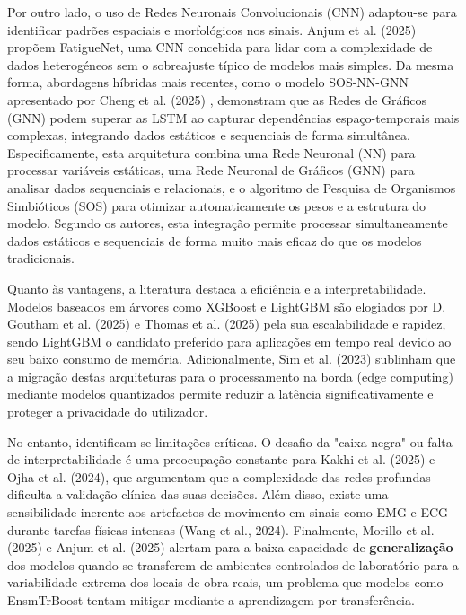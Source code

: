 Por outro lado, o uso de Redes Neuronais Convolucionais (CNN) adaptou-se para identificar padrões espaciais e morfológicos nos sinais. Anjum et al. (2025) \cite{anjum2025} propõem FatigueNet, uma CNN concebida para lidar com a complexidade de dados heterogéneos sem o sobreajuste típico de modelos mais simples. Da mesma forma, abordagens híbridas mais recentes, como o modelo SOS-NN-GNN apresentado por Cheng et al. (2025) \cite{cheng2025}, demonstram que as Redes de Gráficos (GNN) podem superar as LSTM ao capturar dependências espaço-temporais mais complexas, integrando dados estáticos e sequenciais de forma simultânea. Especificamente, esta arquitetura combina uma Rede Neuronal (NN) para processar variáveis estáticas, uma Rede Neuronal de Gráficos (GNN) para analisar dados sequenciais e relacionais, e o algoritmo de Pesquisa de Organismos Simbióticos (SOS) para otimizar automaticamente os pesos e a estrutura do modelo. Segundo os autores, esta integração permite processar simultaneamente dados estáticos e sequenciais de forma muito mais eficaz do que os modelos tradicionais.

Quanto às vantagens, a literatura destaca a eficiência e a interpretabilidade. Modelos baseados em árvores como XGBoost e LightGBM são elogiados por D. Goutham et al. (2025) e Thomas et al. (2025)\cite{goutham2025,thomas2025} pela sua escalabilidade e rapidez, sendo LightGBM o candidato preferido para aplicações em tempo real devido ao seu baixo consumo de memória. Adicionalmente, Sim et al. (2023) \cite{sim2023} sublinham que a migração destas arquiteturas para o processamento na borda (edge computing) mediante modelos quantizados permite reduzir a latência significativamente e proteger a privacidade do utilizador.

No entanto, identificam-se limitações críticas. O desafio da "caixa negra" ou falta de interpretabilidade é uma preocupação constante para Kakhi et al. (2025) e Ojha et al. (2024)\cite{kakhi2025,ojha2024}, que argumentam que a complexidade das redes profundas dificulta a validação clínica das suas decisões. Além disso, existe uma sensibilidade inerente aos artefactos de movimento em sinais como EMG e ECG durante tarefas físicas intensas (Wang et al., 2024)\cite{wang2024}. Finalmente, Morillo et al. (2025) e Anjum et al. (2025)\cite{albarran2025,anjum2025} alertam para a baixa capacidade de \textbf{generalização} dos modelos quando se transferem de ambientes controlados de laboratório para a variabilidade extrema dos locais de obra reais, um problema que modelos como EnsmTrBoost tentam mitigar mediante a aprendizagem por transferência.

